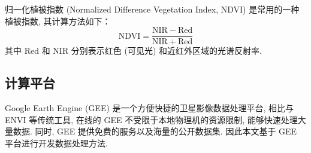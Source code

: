 归一化植被指数 (Normalized Difference Vegetation Index, NDVI) 是常用的一种植被指数, 其计算方法如下：
\begin{equation}
  \mathrm{NDVI} = \frac{\mathrm{NIR} - \mathrm{Red}}{\mathrm{NIR} + \mathrm{Red}}
\end{equation}
其中 $\mathrm{Red}$ 和 $\mathrm{NIR}$ 分别表示红色 (可见光) 和近红外区域的光谱反射率.

\subsection{计算平台}

Google Earth Engine (GEE) 是一个方便快捷的卫星影像数据处理平台, 相比与 ENVI 等传统工具, 在线的 GEE 不受限于本地物理机的资源限制, 能够快速处理大量数据.
同时, GEE 提供免费的服务以及海量的公开数据集.
因此本文基于 GEE 平台进行开发数据处理方法.

